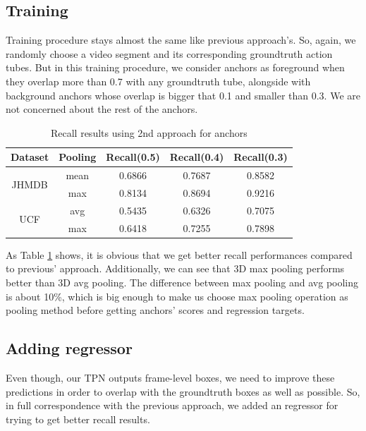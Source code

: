 \subsection{Training}
Training procedure stays almost the same like previous approach's. So, again, we randomly choose  a video segment and its corresponding groundtruth action tubes. But in this training procedure,
we consider anchors as foreground when they overlap more than 0.7 with any groundtruth tube, alongside with background anchors whose overlap is bigger that 0.1 and smaller than 0.3. We are not
concerned about the rest of the anchors.

\begin{table}[h]
  \centering
  \begin{tabular}{||c | c || c  c c||}
    \hline
    \textbf{Dataset} & \textbf{Pooling} &  \textbf{Recall(0.5)} & \textbf{Recall(0.4)} & \textbf{Recall(0.3)} \\
    \hline  \hline
    \multirow{2}{4em}{JHMDB} & mean & 0.6866 & 0.7687 & 0.8582 \\
    \cline{2-5}
    {} & max &  0.8134 & 0.8694 & 0.9216 \\
    \hline
    \multirow{2}{4em}{UCF} & avg &  0.5435 & 0.6326 & 0.7075 \\
    \cline{2-5}
    {} & max & 0.6418 & 0.7255 & 0.7898 \\
    \hline
  \end{tabular}
  \caption{Recall results using 2nd approach for anchors}
  \label{table:tpn_2_1}
\end{table}

As Table \ref{table:tpn_2_1} shows, it is obvious that we get better recall performances compared to previous' approach.
Additionally, we can see that 3D max pooling performs better than 3D avg pooling. The difference
between max pooling and avg pooling is about 10\%, which is big enough to make us choose max pooling operation as pooling method before getting anchors' scores
and regression targets.

\subsection{Adding regressor}

Even though, our TPN outputs frame-level boxes, we need to improve these predictions in order to overlap
with the groundtruth boxes as well as possible.
So, in full correspondence with the previous approach, we added an regressor for trying to get better recall results.

